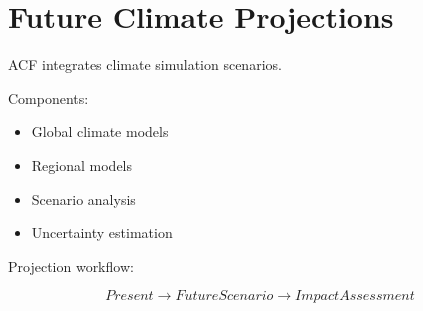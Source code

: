 \section{Future Climate Projections}


ACF integrates climate simulation scenarios.



Components:


\begin{itemize}

\item Global climate models

\item Regional models

\item Scenario analysis

\item Uncertainty estimation

\end{itemize}



Projection workflow:


\[
Present
\rightarrow
Future Scenario
\rightarrow
Impact Assessment
\]
